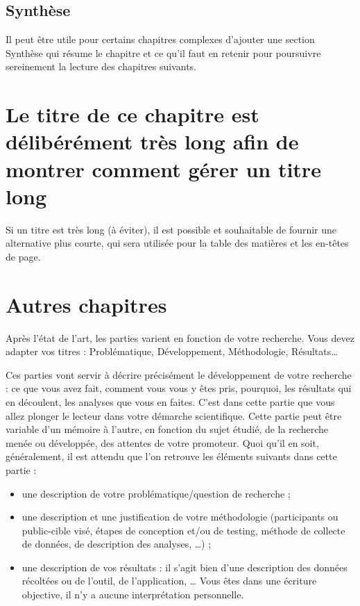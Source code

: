 \documentclass[a4paper,11pt]{book}
\begin{document}
\section{Synthèse}

Il peut être utile pour certains chapitres complexes d'ajouter une
section \og Synthèse\fg{} qui résume le chapitre et ce qu'il faut en
retenir pour poursuivre sereinement la lecture des chapitres suivants.

\chapter[Titre long]{Le titre de ce chapitre est délibérément très long afin de montrer comment gérer un titre long}

Si un titre est très long (à éviter), il est possible et souhaitable
de fournir une alternative plus courte, qui sera utilisée pour la
table des matières et les en-têtes de page.

\chapter{Autres chapitres} 

Après l'état de l'art, les parties varient en fonction de votre
recherche. Vous devez adapter vos titres : Problématique,
Développement, Méthodologie, Résultats\ldots


Ces parties vont servir à décrire précisément le développement de
votre recherche : ce que vous avez fait, comment vous vous y êtes
pris, pourquoi, les résultats qui en découlent, les analyses que vous
en faites. C'est dans cette partie que vous allez plonger le lecteur
dans votre démarche scientifique. Cette partie peut être variable d'un
mémoire à l'autre, en fonction du sujet étudié, de la recherche menée
ou développée, des attentes de votre promoteur. Quoi qu'il en soit,
généralement, il est attendu que l'on retrouve les éléments suivants
dans cette partie :

\begin{itemize}
\item[\textbullet] une description de votre problématique/question de
  recherche ;
\item[\textbullet] une description et une justification de votre
  méthodologie (participants ou public-cible visé, étapes de
  conception et/ou de testing, méthode de collecte de données, de
  description des analyses, …) ;
\item[\textbullet] une description de vos résultats : il s'agit bien
  d'une description des données récoltées ou de l'outil, de
  l'application, … Vous êtes dans une écriture objective, il n'y a
  aucune interprétation personnelle.
\end{itemize}
\end{document}
